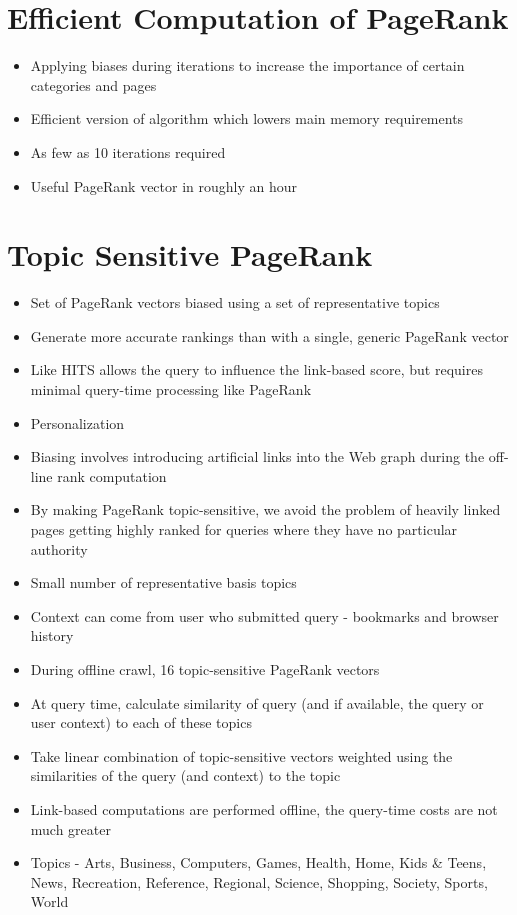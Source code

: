 \documentclass[11pt]{report}
\begin{document}
\section{Efficient Computation of PageRank}
\begin{itemize}
\item Applying biases during iterations to increase the importance of certain categories and pages
\item Efficient version of algorithm which lowers main memory requirements
\item As few as 10 iterations required
\item Useful PageRank vector in roughly an hour
\end{itemize}
\section{Topic Sensitive PageRank}
\begin{itemize}
\item Set of PageRank vectors biased using a set of representative topics
\item Generate more accurate rankings than with a single, generic PageRank vector
\item Like HITS allows the query to influence the link-based score, but requires minimal query-time processing like PageRank
\item Personalization
\item Biasing involves introducing artificial links into the Web graph during the off-line rank computation
\item By making PageRank topic-sensitive, we avoid the problem of heavily linked pages getting highly ranked for queries where they have no particular authority
\item Small number of representative basis topics
\item Context can come from user who submitted query - bookmarks and browser history
\item During offline crawl, 16 topic-sensitive PageRank vectors 
\item At query time, calculate similarity of query (and if available, the query or user context) to each of these topics
\item Take linear combination of topic-sensitive vectors weighted using the similarities of the query (and context) to the topic
\item Link-based computations are performed offline, the query-time costs are not much greater
\item Topics - Arts, Business, Computers, Games, Health, Home, Kids \& Teens, News, Recreation, Reference, Regional, Science, Shopping, Society, Sports, World
\end{itemize}
\end{document}
